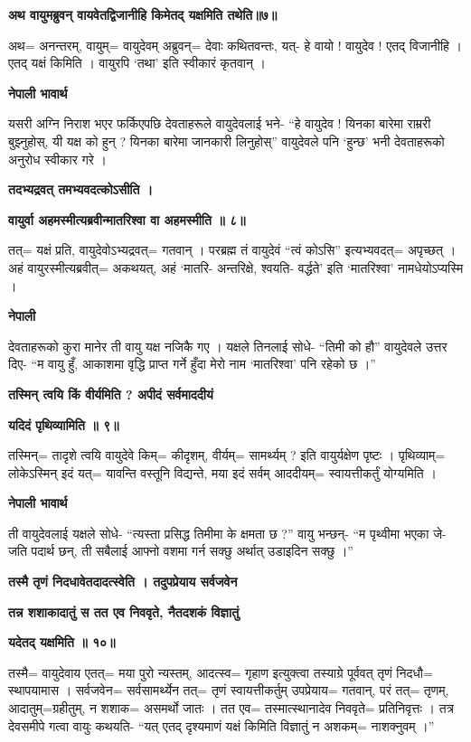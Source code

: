 \documentclass[11pt, a5paper]{article}
\begin{document}
\textbf{अथ वायुमब्रुवन् वायवेतद्विजानीहि किमेतद् यक्षमिति तथेति॥७॥}

अथ= अनन्तरम्, वायुम्= वायुदेवम् अब्रुवन्= देवाः कथितवन्तः, यत्- हे वायो ! वायुदेव ! एतद् विजानीहि । एतद् यक्षं किमिति । वायुरपि ‘तथा’ इति स्वीकारं कृतवान् ।

\textbf{नेपाली भावार्थ}

यसरी अग्नि निराश भएर फर्किएपछि देवताहरूले वायुदेवलाई भने- “हे वायुदेव ! यिनका बारेमा राम्ररी बुझ्नुहोस्, यी यक्ष को हुन् ? यिनका बारेमा जानकारी लिनुहोस्” वायुदेवले पनि ‘हुन्छ’ भनी देवताहरूको अनुरोध स्वीकार गरे ।

\textbf{तदभ्यद्रवत् तमभ्यवदत्कोऽसीति ।}

\textbf{वायुर्वा अहमस्मीत्यब्रवीन्मातरिश्वा वा अहमस्मीति ॥ ८॥}

तत्= यक्षं प्रति, वायुदेवोऽभ्यद्रवत्= गतवान् । परब्रह्म तं वायुदेवं “त्वं कोऽसि” इत्यभ्यवदत्= अपृच्छत् । अहं वायुरस्मीत्यब्रवीत्= अकथयत्, अहं ‘मातरि- अन्तरिक्षे, श्वयति- वर्द्धते’ इति ‘मातरिश्वा’ नामधेयोऽप्यस्मि ।

\textbf{नेपाली}

देवताहरूको कुरा मानेर ती वायु यक्ष नजिकै गए । यक्षले तिनलाई सोधे- “तिमी को हौ” वायुदेवले उत्तर दिए- “म वायु हुँ, आकाशमा वृद्धि प्राप्त गर्ने हुँदा मेरो नाम ‘मातरिश्वा’ पनि रहेको छ ।”

\textbf{तस्मिन् त्वयि किं वीर्यमिति ? अपीदं सर्वमाददीयं}

\textbf{यदिदं पृथिव्यामिति ॥ ९॥}

तस्मिन्= तादृशे त्वयि वायुदेवे किम्= कीदृशम्, वीर्यम्= सामर्थ्यम् ? इति वायुर्यक्षेण पृष्टः । पृथिव्याम्= लोकेऽस्मिन् इदं यत्= यावन्ति वस्तूनि विद्यन्ते, मया इदं सर्वम् आददीयम्= स्वायत्तीकर्तुं योग्यमिति ।

\textbf{नेपाली भावार्थ}

ती वायुदेवलाई यक्षले सोधे- “त्यस्ता प्रसिद्ध तिमीमा के क्षमता छ ?” वायु भन्छन्- “म पृथ्वीमा भएका जे-जति पदार्थ छन्, ती सबैलाई आफ्नो वशमा गर्न सक्छु अर्थात् उडाइदिन सक्छु ।”

\textbf{तस्मै तृणं निदधावेतदादत्स्वेति । तदुपप्रेयाय सर्वजवेन}

\textbf{तन्न शशाकादातुं स तत एव निववृते, नैतदशकं विज्ञातुं}

\textbf{यदेतद् यक्षमिति ॥ १०॥}

तस्मै= वायुदेवाय एतत्= मया पुरो न्यस्तम्, आदत्स्व= गृहाण इत्युक्त्वा तस्याग्रे पूर्ववत् तृणं निदधौ= स्थापयामास । सर्वजवेन= सर्वसामर्थ्येन तत्= तृणं स्वायत्तीकर्तुम् उपप्रेयाय= गतवान्, परं तत्= तृणम्, आदातुम्=ग्रहीतुम्, न शशाक= असमर्थो जातः । तत एव= तस्मात्स्थानादेव निववृते= प्रतिनिवृत्तः । तत्र देवसमीपे गत्वा वायुः कथयति- “यत् एतद् दृश्यमाणं यक्षं किमिति विज्ञातुं न अशकम्= नाशक्नुवम् ।”
\end{document}
